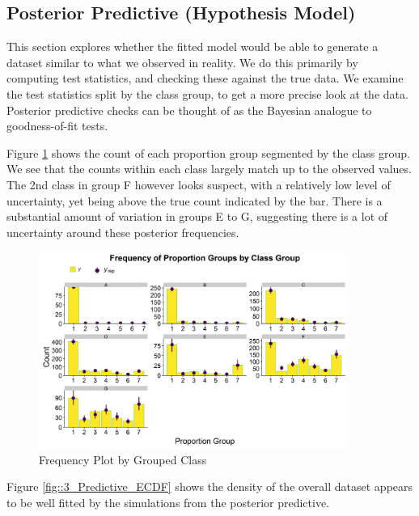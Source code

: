 \documentclass[11pt,twoside]{article}
\numberwithin{Theorem}{section}
\numberwithin{Definition}{section}
\numberwithin{Lemma}{section}
\numberwithin{Algorithm}{section}
\numberwithin{equation}{section}
\begin{document}
\newpage
\subsection{Posterior Predictive (Hypothesis Model)}

This section explores whether the fitted model would be able to generate a dataset similar to what we observed in reality. We do this primarily by computing test statistics, and checking these against the true data. We examine the test statistics split by the class group, to get a more precise look at the data. Posterior predictive checks can be thought of as the Bayesian analogue to goodness-of-fit tests. 

Figure \ref{fig::3_Predictive_BarClass} shows the count of each proportion group segmented by the class group. We see that the counts within each class largely match up to the observed values. The 2nd class in group F however looks suspect, with a relatively low level of uncertainty, yet being above the true count indicated by the bar. There is a substantial amount of variation in groups E to G, suggesting there is a lot of uncertainty around these posterior frequencies. 

\begin{figure}[h!]
	\centering
	\includegraphics[width =  0.9\textwidth, height = 0.37\textheight]{Figures/3_1_Primary_PostPred_BarClass.png}
	\caption{Frequency Plot by Grouped Class} \label{fig::3_Predictive_BarClass}	
\end{figure}


Figure \ref{fig::3_Predictive_ECDF} shows the density of the overall dataset appears to be well fitted by the simulations from the posterior predictive. 
\end{document}

